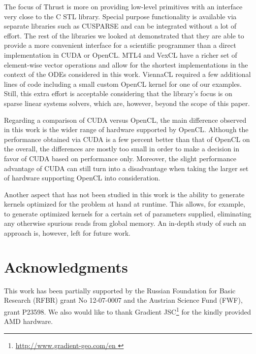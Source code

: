 \documentclass[final]{siamltex}
\newcommand{\addpp}[1]{{#1\nolinebreak[4]\hspace{-.05em}\raisebox{.4ex}{\tiny\bf ++}}\xspace}
\newcommand{\Cpp}{\addpp{C}}
\begin{document}
The focus of Thrust is more on providing low-level primitives with an
interface very close to the \Cpp STL library.  Special purpose
functionality is available via separate libraries such as CUSPARSE and
can be integrated without a lot of effort.  The rest of the libraries
we looked at demonstrated that they are able to provide a more
convenient interface for a scientific programmer than a direct
implementation in CUDA or OpenCL.  MTL4 and VexCL have a richer set of
element-wise vector operations and allow for the shortest
implementations in the context of the ODEs considered in this work.
ViennaCL required a few additional lines of code including a small
custom OpenCL kernel for one of our examples.  Still, this extra
effort is acceptable considering that the library's focus is on sparse
linear systems solvers, which are, however, beyond the scope of this
paper.

Regarding a comparison of CUDA versus OpenCL, the main difference observed in
this work is the wider range of hardware supported by OpenCL.  Although the performance
obtained via CUDA is a few percent better than that of OpenCL on the overall,
the differences are mostly too small in order to make a decision in favor of
CUDA based on performance only.  Moreover, the slight performance advantage of
CUDA can still turn into a disadvantage when taking the larger set of hardware
supporting OpenCL into consideration.


Another aspect that has not been studied in this work is the ability to
generate kernels optimized for the problem at hand at runtime. This allows, for
example, to generate optimized kernels for a certain set of parameters
supplied, eliminating any otherwise spurious reads from global memory.  An
in-depth study of such an approach is, however, left for future work.

\section{Acknowledgments}

This work has been partially supported by the Russian Foundation for Basic
Research (RFBR) grant No 12-07-0007 and the Austrian Science Fund (FWF), grant
P23598.  We also would like to thank Gradient JSC\footnote{ \href{
http://www.gradient-geo.com/en }{ http://www.gradient-geo.com/en } } for the
kindly provided AMD hardware.




\end{document}
